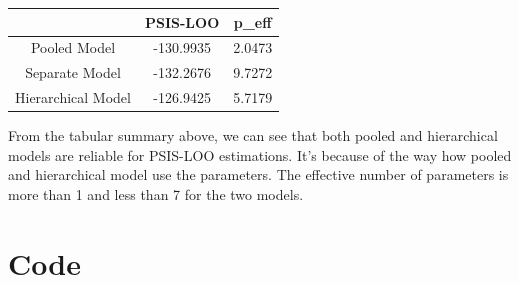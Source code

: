 \documentclass{article}
\begin{document}
\begin{center}
\begin{tabular}{ccc}
	\toprule
	&PSIS-LOO&p\_eff\\
	\midrule
	Pooled Model& -130.9935&2.0473\\
	Separate Model&-132.2676&9.7272\\
	Hierarchical Model&-126.9425&5.7179\\
	\bottomrule
\end{tabular}
\end{center}

From the tabular summary above, we can see that both pooled and hierarchical models are reliable for PSIS-LOO estimations. It's because of the way how pooled and hierarchical model use the parameters. The effective number of parameters is more than 1 and less than 7 for the two models. 
\appendix
\section{Code}
\end{document}
